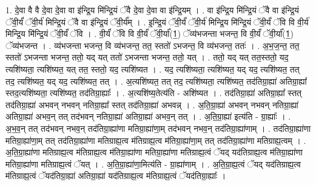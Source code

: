 \documentclass[17pt]{extarticle}
\begin{document}
1. दे॒वा वै वै दे॒वा दे॒वा वा इ॑न्द्रि॒य मि॑न्द्रि॒यं ॅवै दे॒वा दे॒वा वा इ॑न्द्रि॒यम् । . वा इ॑न्द्रि॒य मि॑न्द्रि॒यं ॅवै वा इ॑न्द्रि॒यं ॅवी॒र्यं॑ ॅवी॒र्य॑ मिन्द्रि॒यं ॅवै वा इ॑न्द्रि॒यं ॅवी॒र्य᳚म् । . इ॒न्द्रि॒यं ॅवी॒र्यं॑ ॅवी॒र्य॑ मिन्द्रि॒य मि॑न्द्रि॒यं ॅवी॒र्यं॑ ॅवि वि वी॒र्य॑ मिन्द्रि॒य मि॑न्द्रि॒यं ॅवी॒र्यं॑ ॅवि । . वी॒र्यं॑ ॅवि वि वी॒र्यं॑ ॅवी॒र्या᳚(1॒) ॅव्य॑भजन्ता भजन्त॒ वि वी॒र्यं॑ ॅवी॒र्या᳚(1॒) ॅव्य॑भजन्त । . व्य॑भजन्ता भजन्त॒ वि व्य॑भजन्त॒ तत॒ स्ततो॑ ऽभजन्त॒ वि व्य॑भजन्त॒ ततः॑ । . अ॒भ॒ज॒न्त॒ तत॒ स्ततो॑ ऽभजन्ता भजन्त॒ ततो॒ यद् यत् ततो॑ ऽभजन्ता भजन्त॒ ततो॒ यत् । . ततो॒ यद् यत् तत॒स्ततो॒ यद॒ त्यशि॑ष्यता॒ त्यशि॑ष्यत॒ यत् तत॒ स्ततो॒ यद॒ त्यशि॑ष्यत । . यद॒ त्यशि॑ष्यता॒ त्यशि॑ष्यत॒ यद् यद॒ त्यशि॑ष्यत॒ तत् तद॒ त्यशि॑ष्यत॒ यद् यद॒ त्यशि॑ष्यत॒ तत् । . अ॒त्यशि॑ष्यत॒ तत् तद॒ त्यशि॑ष्यता॒ त्यशि॑ष्यत॒ तद॑तिग्रा॒ह्या॑ अतिग्रा॒ह्या᳚ स्तद॒त्यशि॑ष्यता॒ त्यशि॑ष्यत॒ तद॑तिग्रा॒ह्याः᳚ । . अ॒त्यशि॑ष्य॒तेत्य॑ति - अशि॑ष्यत । . तद॑तिग्रा॒ह्या॑ अतिग्रा॒ह्या᳚ स्तत् तद॑तिग्रा॒ह्या॑ अभवन् नभवन् नतिग्रा॒ह्या᳚ स्तत् तद॑तिग्रा॒ह्या॑ अभवन्न् । . अ॒ति॒ग्रा॒ह्या॑ अभवन् नभवन् नतिग्रा॒ह्या॑ अतिग्रा॒ह्या॑ अभव॒न् तत् तद॑भवन् नतिग्रा॒ह्या॑ अतिग्रा॒ह्या॑ अभव॒न् तत् । . अ॒ति॒ग्रा॒ह्या॑ इत्य॑ति - ग्रा॒ह्याः᳚ । . अ॒भ॒व॒न् तत् तद॑भवन् नभव॒न् तद॑तिग्रा॒ह्या॑णा मतिग्रा॒ह्या॑णा॒म् तद॑भवन् नभव॒न् तद॑तिग्रा॒ह्या॑णाम् । . तद॑तिग्रा॒ह्या॑णा मतिग्रा॒ह्या॑णा॒म् तत् तद॑तिग्रा॒ह्या॑णा मतिग्राह्य॒त्व म॑तिग्राह्य॒त्व म॑तिग्रा॒ह्या॑णा॒म् तत् तद॑तिग्रा॒ह्या॑णा मतिग्राह्य॒त्वम् । . अ॒ति॒ग्रा॒ह्या॑णा मतिग्राह्य॒त्व म॑तिग्राह्य॒त्व म॑तिग्रा॒ह्या॑णा मतिग्रा॒ह्या॑णा मतिग्राह्य॒त्वं ॅयद् यद॑तिग्राह्य॒त्व म॑तिग्रा॒ह्या॑णा मतिग्रा॒ह्या॑णा मतिग्राह्य॒त्वं ॅयत् । . अ॒ति॒ग्रा॒ह्या॑णा॒मित्य॑ति - ग्रा॒ह्या॑णाम् । . अ॒ति॒ग्रा॒ह्य॒त्वं ॅयद् यद॑तिग्राह्य॒त्व म॑तिग्राह्य॒त्वं ॅयद॑तिग्रा॒ह्या॑ अतिग्रा॒ह्या॑ यद॑तिग्राह्य॒त्व म॑तिग्राह्य॒त्वं ॅयद॑तिग्रा॒ह्याः᳚ । \newline
\end{document}
